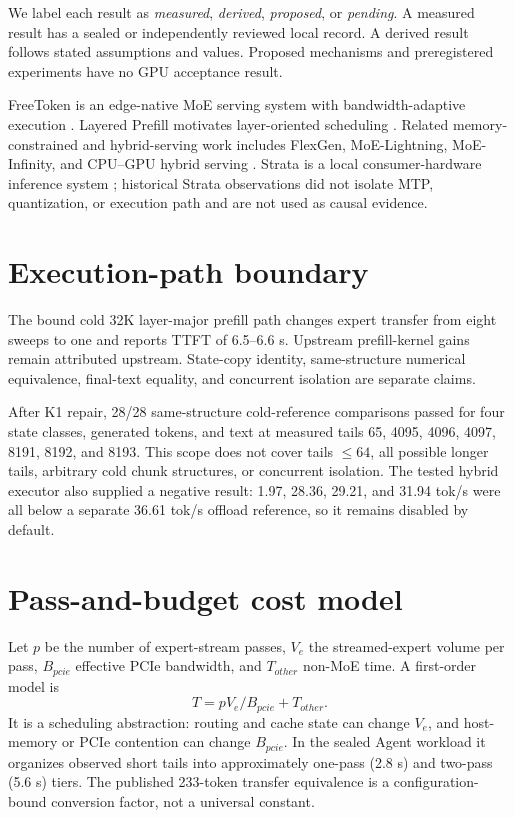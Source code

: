 \documentclass[11pt]{article}
\begin{document}
We label each result as \emph{measured}, \emph{derived}, \emph{proposed}, or \emph{pending}. A measured result has a sealed or independently reviewed local record. A derived result follows stated assumptions and values. Proposed mechanisms and preregistered experiments have no GPU acceptance result.

FreeToken is an edge-native MoE serving system with bandwidth-adaptive execution \cite{freetoken}. Layered Prefill motivates layer-oriented scheduling \cite{layeredprefill}. Related memory-constrained and hybrid-serving work includes FlexGen, MoE-Lightning, MoE-Infinity, and CPU--GPU hybrid serving \cite{flexgen,moelightning,moeinfinity,hybrid}. Strata is a local consumer-hardware inference system \cite{strata}; historical Strata observations did not isolate MTP, quantization, or execution path and are not used as causal evidence.

\section{Execution-path boundary}
The bound cold 32K layer-major prefill path changes expert transfer from eight sweeps to one and reports TTFT of 6.5--6.6 s. Upstream prefill-kernel gains remain attributed upstream. State-copy identity, same-structure numerical equivalence, final-text equality, and concurrent isolation are separate claims.

After K1 repair, 28/28 same-structure cold-reference comparisons passed for four state classes, generated tokens, and text at measured tails 65, 4095, 4096, 4097, 8191, 8192, and 8193. This scope does not cover tails $\leq64$, all possible longer tails, arbitrary cold chunk structures, or concurrent isolation. The tested hybrid executor also supplied a negative result: 1.97, 28.36, 29.21, and 31.94 tok/s were all below a separate 36.61 tok/s offload reference, so it remains disabled by default.

\section{Pass-and-budget cost model}
Let $p$ be the number of expert-stream passes, $V_e$ the streamed-expert volume per pass, $B_{pcie}$ effective PCIe bandwidth, and $T_{other}$ non-MoE time. A first-order model is
\begin{equation}
T = p V_e / B_{pcie} + T_{other}.
\end{equation}
It is a scheduling abstraction: routing and cache state can change $V_e$, and host-memory or PCIe contention can change $B_{pcie}$. In the sealed Agent workload it organizes observed short tails into approximately one-pass (2.8 s) and two-pass (5.6 s) tiers. The published 233-token transfer equivalence is a configuration-bound conversion factor, not a universal constant.
\end{document}
